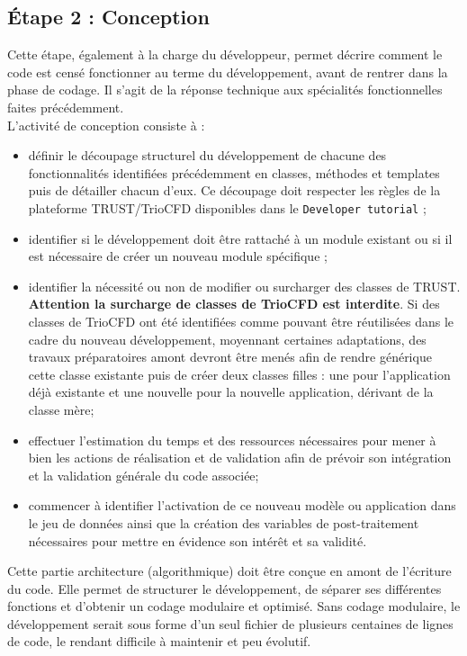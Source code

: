 \subsection{Étape 2 : Conception}
Cette étape, également à la charge du développeur,
permet décrire comment le code est censé fonctionner au terme du développement, avant de rentrer dans la phase de codage.
Il s'agit de la réponse technique aux spécialités fonctionnelles faites précédemment.\\
L'activité de conception consiste à :\\
\begin{itemize}[label=$\Rightarrow$, font=\LARGE]
   \item définir le découpage structurel du développement de chacune des
         fonctionnalités identifiées précédemment en classes, méthodes
         et templates puis de détailler chacun d'eux.
         Ce découpage doit respecter les règles de la plateforme TRUST/TrioCFD disponibles dans le \texttt{Developer tutorial} ;
   \item identifier si le développement doit être rattaché à un module existant
         ou si il est nécessaire de créer un nouveau module spécifique ;
   \item identifier la nécessité ou non de modifier ou surcharger des classes de TRUST.
         \textbf{Attention la surcharge de classes de TrioCFD est interdite}.
         Si des classes de TrioCFD ont été identifiées comme pouvant être réutilisées
         dans le cadre du nouveau développement, moyennant certaines adaptations,
         des travaux préparatoires amont devront être menés afin de rendre générique
         cette classe existante puis de créer deux classes filles :
         une pour l'application déjà existante et une nouvelle pour la nouvelle application,
         dérivant de la classe mère;
   \item effectuer l'estimation du temps et des ressources nécessaires pour mener
         à bien les actions de réalisation et de validation afin de prévoir
         son intégration et la validation générale du code associée;
   \item commencer à identifier l'activation de ce nouveau modèle ou application
         dans le jeu de données ainsi que la création des variables de post-traitement
         nécessaires pour mettre en évidence son intérêt et sa validité.
 \end{itemize}
Cette partie architecture (algorithmique) doit être con\c cue en amont de l'écriture du code.
Elle permet de structurer le développement, de séparer ses différentes fonctions
et d'obtenir un codage modulaire et optimisé.
Sans codage modulaire, le développement serait sous forme d'un seul fichier
de plusieurs centaines de lignes de code, le rendant difficile à maintenir et peu évolutif. 

